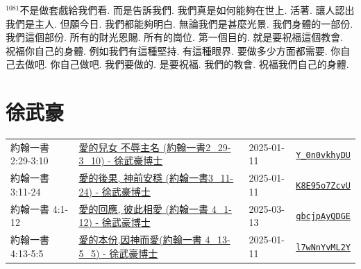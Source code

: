 \documentclass{book}
\begin{document}
$^{1081}$不是做套戲給我們看.
而是告訴我們.
我們真是如何能夠在世上.
活著.
讓人認出我們是主人.
但願今日.
我們都能夠明白.
無論我們是甚麼光景.
我們身體的一部份.
我們這個部份.
所有的財光恩賜.
所有的崗位.
第一個目的.
就是要祝福這個教會.
祝福你自己的身體.
例如我們有這種堅持.
有這種眼界.
要做多少方面都需要.
你自己去做吧.
你自己做吧.
我們要做的.
是要祝福.
我們的教會.
祝福我們自己的身體.
\newpage



\chapter{徐武豪}\label{ch:preacher4}
\begin{multicols}{3}
\minitoc
\end{multicols}
{ \scriptsize


\begin{xltabular}{\textwidth}{|p{0.15\textwidth} p{0.6\textwidth}|p{0.07\textwidth} p{0.1\textwidth}|}
\hline
約翰一書 2:29-3:10 & \hyperref[sec:Y_0n0vkhyDU]{愛的兒女 不辱主名 (約翰一書2\_29-3\_10) - 徐武豪博士} & 2025-01-11 & \href{https://youtube.com/watch?v=Y_0n0vkhyDU}{\texttt{Y\_0n0vkhyDU}} \\
約翰一書 3:11-24 & \hyperref[sec:K8E95o7ZcvU]{愛的後果, 神前安穩 (約翰一書3\_11-24) - 徐武豪博士} & 2025-01-11 & \href{https://youtube.com/watch?v=K8E95o7ZcvU}{\texttt{K8E95o7ZcvU}} \\
約翰一書 4:1-12 & \hyperref[sec:qbcjpAyQDGE]{愛的回應, 彼此相愛 (約翰一書 4\_1-12) - 徐武豪博士} & 2025-03-13 & \href{https://youtube.com/watch?v=qbcjpAyQDGE}{\texttt{qbcjpAyQDGE}} \\
約翰一書 4:13-5:5 & \hyperref[sec:l7wNnYvML2Y]{愛的本份,因神而愛(約翰一書 4\_13-5\_5) - 徐武豪博士} & 2025-01-11 & \href{https://youtube.com/watch?v=l7wNnYvML2Y}{\texttt{l7wNnYvML2Y}} \\
\hline
\end{xltabular}
}
\newpage
\end{document}
